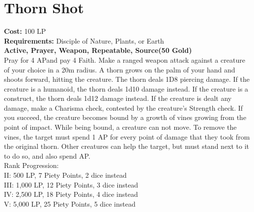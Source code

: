 \section{Thorn Shot}\label{prayer:thornShot}
\textbf{Cost:} 100 LP\\
\textbf{Requirements:} Disciple of Nature, Plants, or Earth \\
\textbf{Active, Prayer, Weapon, Repeatable, Source(50 Gold)}\\
Pray for 4 APand pay 4 Faith.
Make a ranged weapon attack against a creature of your choice in a 20m radius.
A thorn grows on the palm of your hand and shoots forward, hitting the creature.
The thorn deals 1D8 piercing damage.
If the creature is a humanoid, the thorn deals 1d10 damage instead.
If the creature is a construct, the thorn deals 1d12 damage instead.
If the creature is dealt any damage, make a Charisma check, contested by the creature's Strength check.
If you succeed, the creature becomes bound by a growth of vines growing from the point of impact.
While being bound, a creature can not move.
To remove the vines, the target must spend 1 AP for every point of damage that they took from the original thorn.
Other creatures can help the target, but must stand next to it to do so, and also spend AP.
\\
Rank Progression:\\
II: 500 LP, 7 Piety Points, 2 dice instead\\
III: 1,000 LP, 12 Piety Points, 3 dice instead\\
IV: 2,500 LP, 18 Piety Points, 4 dice instead\\
V: 5,000 LP, 25 Piety Points, 5 dice instead\\